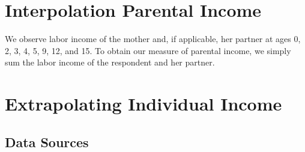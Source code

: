 \section{Interpolation Parental Income}
\label{app:parent_income}


\noindent We observe labor income of the mother and, if applicable, her partner at
ages 0, 2, 3, 4, 5, 9, 12, and 15. To obtain our measure of parental income, we simply
sum the labor income of the respondent and her partner. \\





\setcounter{figure}{0}  \renewcommand{\thefigure}{E.\arabic{figure}}
\setcounter{table}{0}   \renewcommand{\thetable}{E.\arabic{table}}
\section{Extrapolating Individual Income}
\label{app:subject_income}

\subsection{Data Sources}

